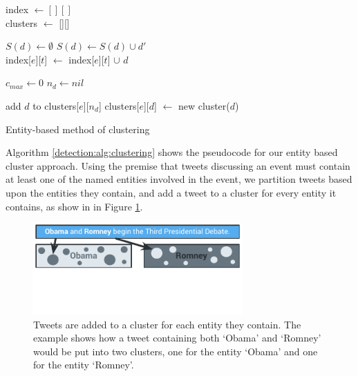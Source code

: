 \begin{algorithm}[t]
	\DontPrintSemicolon
	index $\gets [][]$ \\
	clusters $\gets$ [][] \\

	 {

		 {

			$S(d) \gets \emptyset$ 
			 {
				 {
					$S(d) \gets S(d) \cup d'$ \\
				}
				index[$e$][$t$] $\gets$ index[$e$][$t$] $\cup$ $d$ \\
			}

			$c_{max} \gets 0$ 
			$n_{d} \gets nil$ 

			 {
				add $d$ to clusters[$e$][$n_d$]
			}{
				clusters[$e$][$d$] $\gets$ new cluster($d$) 
			}

		}
	}

\caption{Entity-based method of clustering}
\label{detection:alg:clustering}
\end{algorithm}

Algorithm \ref{detection:alg:clustering} shows the pseudocode for our entity based cluster approach.
Using the premise that tweets discussing an event must contain at least one of the named entities involved in the event, we partition tweets based upon the entities they contain, and add a tweet to a cluster for every entity it contains, as show in in Figure \ref{detection:graphic:clustering}.

\begin{figure}[h!]
	\centering
	\includegraphics[width=8cm,trim=0cm 1.5cm 0cm 0cm]{Chapters/EntityDetection/images/clustering.pdf}
	\caption[Entity-based clustering]{Tweets are added to a cluster for each entity they contain. The example shows how a tweet containing both `Obama' and `Romney' would be put into two clusters, one for the entity `Obama' and one for the entity `Romney'.}
	\label{detection:graphic:clustering}
\end{figure}


